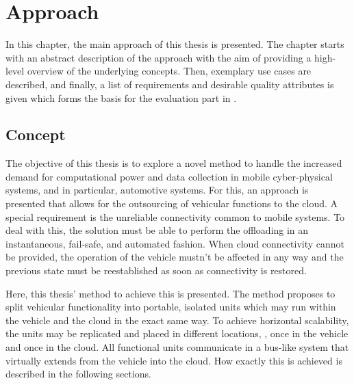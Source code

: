 
\chapter{Approach}\label{chapter:approach}

In this chapter, the main approach of this thesis is presented. The chapter starts with an abstract description of the approach with the aim of providing a high-level overview of the underlying concepts. Then, exemplary use cases are described, and finally, a list of requirements and desirable quality attributes is given which forms the basis for the evaluation part in .

%
%
%
%
%
%
%
%
%
%

\section{Concept} \label{sec:concept}
The objective of this thesis is to explore a novel method to handle the increased demand for computational power and data collection in mobile cyber-physical systems, and in particular, automotive systems. For this, an approach is presented that allows for the outsourcing of vehicular functions to the cloud.
A special requirement is the unreliable connectivity common to mobile systems. To deal with this, the solution must be able to perform the offloading in an instantaneous, fail-safe, and automated fashion. When cloud connectivity cannot be provided, the operation of the vehicle mustn't be affected in any way and the previous state must be reestablished as soon as connectivity is restored.

Here, this thesis' method to achieve this is presented. The method proposes to split vehicular functionality into portable, isolated units which may run within the vehicle and the cloud in the exact same way. To achieve horizontal scalability, the units may be replicated and placed in different locations, \eg , once in the vehicle and once in the cloud. All functional units communicate in a bus-like system that virtually extends from the vehicle into the cloud. How exactly this is achieved is described in the following sections.


